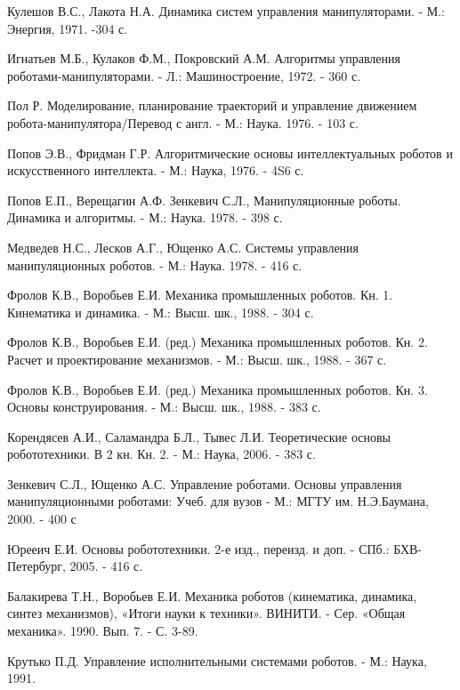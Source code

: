\begin{thebibliography}{10} \label{bibl}
	Кулешов В.С., Лакота Н.А. Динамика систем управления манипуляторами. - М.: Энергия, 1971. -304 с.
	
	Игнатьев М.Б., Кулаков Ф.М., Покровский А.М. Алгоритмы управления роботами-манипуляторами. - Л.: Машиностроение, 1972. - 360 с.
	
	Пол Р. Моделирование, планирование траекторий и управление движением робота-манипулятора/Перевод с англ. - М.: Наука. 1976. - 103 с.
	
	Попов Э.В., Фридман Г.Р. Алгоритмические основы интеллектуальных роботов и искусственного интеллекта. - М.: Наука, 1976. - 4S6 с.
	
	Попов Е.П., Верещагин А.Ф. Зенкевич С.Л., Манипуляционные роботы. Динамика и алгоритмы. - М.: Наука. 1978. - 398 с.
	
	Медведев Н.С., Лесков А.Г., Ющенко А.С. Системы управления манипуляционных роботов. - М.: Наука. 1978. - 416 с.
	
	Фролов К.В., Воробьев Е.И. Механика промышленных роботов. Кн. 1. Кинематика и динамика. - М.: Высш. шк., 1988. - 304 с.
	
	Фролов К.В., Воробьев Е.И. (ред.) Механика промышленных роботов. Кн. 2. Расчет и проектирование механизмов. - М.: Высш. шк., 1988. - 367 с.
	
	Фролов К.В., Воробьев Е.И. (ред.) Механика промышленных роботов. Кн. 3. Основы конструирования. - М.: Высш. шк., 1988. - 383 с.
	
	Корендясев А.И., Саламандра Б.Л., Тывес Л.И. Теоретические основы робототехники. В 2 кн. Кн. 2. - М.: Наука, 2006. - 383 с.
	
	Зенкевич С.Л., Ющенко А.С. Управление роботами. Основы управления манипуляционными роботами: Учеб. для вузов - М.: МГТУ им. Н.Э.Баумана, 2000. - 400 с
	
	Юрееич Е.И. Основы робототехники. 2-е изд., переизд. и доп. - СПб.: БХВ-Петербург, 2005. - 416 с.
	
	Балакирева Т.Н., Воробьев Е.И. Механика роботов (кинематика, динамика, синтез механизмов), «Итоги науки к техники». ВИНИТИ. - Сер. «Общая механика». 1990. Вып. 7. - С. 3-89.
	
	Крутько П.Д. Управление исполнительными системами роботов. - М.: Наука, 1991.
	

\end{thebibliography}
